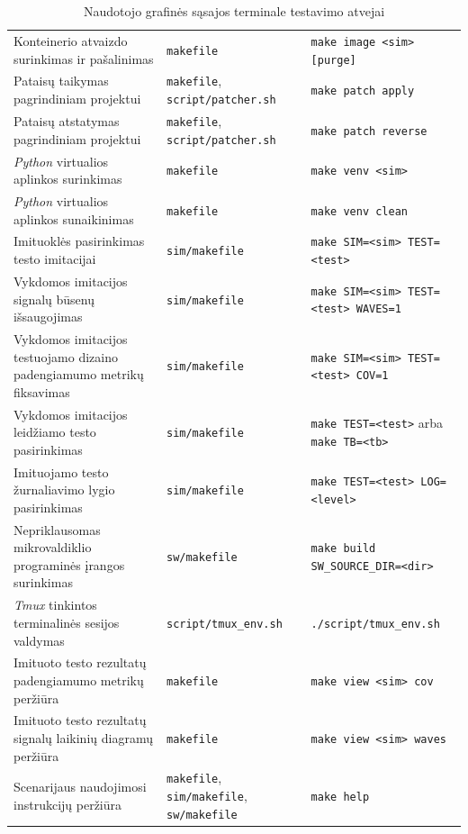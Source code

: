 \begin{table}[H]
	\centering
	\caption{Naudotojo grafinės sąsajos terminale testavimo atvejai}
	\label{tab:test_gui_usecase}
	\renewcommand{\arraystretch}{1.2} %
	\begin{tabularx}{\linewidth}{|>{\raggedright\arraybackslash}X|>{\centering\arraybackslash}X|>{\raggedright\arraybackslash}X|}
		\hline
		\thead[l]{Testavimo atvejis} & \thead{Scenarijaus failas} & \thead[l]{Užklausa (testuota komanda)} \\
		\hline
		Konteinerio atvaizdo surinkimas ir pašalinimas & \texttt{makefile} & \texttt{make image <sim> [purge]} \\
		\hline
		Pataisų taikymas pagrindiniam projektui & \texttt{makefile}, \texttt{script/patcher.sh} & \texttt{make patch apply} \\
		\hline
		Pataisų atstatymas pagrindiniam projektui & \texttt{makefile}, \texttt{script/patcher.sh} & \texttt{make patch reverse} \\
		\hline
		\textit{Python} virtualios aplinkos surinkimas & \texttt{makefile} & \texttt{make venv <sim>} \\
		\hline
		\textit{Python} virtualios aplinkos sunaikinimas & \texttt{makefile} & \texttt{make venv clean} \\
		\hline
		Imituoklės pasirinkimas testo imitacijai & \texttt{sim/makefile} & \texttt{make SIM=<sim> TEST=<test>} \\
		\hline
		Vykdomos imitacijos signalų būsenų išsaugojimas & \texttt{sim/makefile} & \texttt{make SIM=<sim> TEST=<test> WAVES=1} \\
		\hline
		Vykdomos imitacijos testuojamo dizaino padengiamumo metrikų fiksavimas & \texttt{sim/makefile} & \texttt{make SIM=<sim> TEST=<test> COV=1} \\
		\hline
		Vykdomos imitacijos leidžiamo testo pasirinkimas & \texttt{sim/makefile} & \texttt{make TEST=<test>} arba \texttt{make TB=<tb>} \\
		\hline
		Imituojamo testo žurnaliavimo \angl{logging} lygio pasirinkimas & \texttt{sim/makefile} & \texttt{make TEST=<test> LOG=<level>} \\
		\hline
		Nepriklausomas mikrovaldiklio programinės įrangos surinkimas & \texttt{sw/makefile} & \texttt{make build SW\_SOURCE\_DIR=<dir>} \\
		\hline
		\textit{Tmux} tinkintos \angl{customized} terminalinės sesijos valdymas & \texttt{script/tmux\_env.sh} & \texttt{./script/tmux\_env.sh} \\
		\hline
		Imituoto testo rezultatų padengiamumo metrikų peržiūra & \texttt{makefile} & \texttt{make view <sim> cov} \\
		\hline
		Imituoto testo rezultatų signalų laikinių diagramų peržiūra & \texttt{makefile} & \texttt{make view <sim> waves} \\
		\hline
		Scenarijaus naudojimosi instrukcijų peržiūra & \texttt{makefile}, \texttt{sim/makefile}, \texttt{sw/makefile} & \texttt{make help} \\
		\hline
	\end{tabularx}
\end{table}


